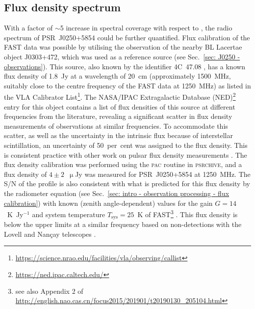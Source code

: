 \subsection{Flux density spectrum}
\label{sec: J0250 - analysis - flux}

With a factor of $\sim$5 increase in spectral coverage with respect to \citet{TBC+2018}, the radio spectrum of PSR~J0250+5854 could be further quantified. Flux calibration of the FAST data was possible by utilising the observation of the nearby BL Lacertae object J0303+472, which was used as a reference source (see Sec.~\ref{sec: J0250 - observations}). This source, also known by the identifier 4C~47.08 \citep{VVxx2006}, has a known flux density of 1.8~Jy at a wavelength of 20~cm (approximately 1500~MHz, suitably close to the centre frequency of the FAST data at 1250~MHz) as listed in the VLA Calibrator List\footnote{\url{https://science.nrao.edu/facilities/vla/observing/callist}}. The NASA/IPAC Extragalactic Database (NED)\footnote{\url{https://ned.ipac.caltech.edu/}} entry for this object contains a list of flux densities of this source at different frequencies from the literature, revealing a significant scatter in flux density measurements of observations at similar frequencies. To accommodate this scatter, as well as the uncertainty in the intrinsic flux because of interstellar scintillation, an uncertainty of 50~per~cent was assigned to the flux density. This is consistent practice with other work on pulsar flux density measurements \citep[e.g.][]{Sxxx1973}. The flux density calibration was performed using the \textsc{pac} routine in \textsc{psrchive}, and a flux density of $4\pm2$~$\upmu$Jy was measured for PSR~J0250+5854 at 1250~MHz. The S/N of the profile is also consistent with what is predicted for this flux density by the radiometer equation (see Sec.~\ref{sec: intro - observation processing - flux calibration}) with known (zenith angle-dependent) values for the gain $G = 14$~K~Jy$^{-1}$ and system temperature $T_\mathrm{sys} = 25$~K of FAST\footnote{see also Appendix 2 of \url{http://english.nao.cas.cn/focus2015/201901/t20190130_205104.html}} \citep{LWQ+2018}. This flux density is below the upper limits at a similar frequency based on non-detections with the Lovell and Nan\c{c}ay telescopes \citep[0.009~mJy and 0.015~mJy resepectively, ][]{TBC+2018}.

